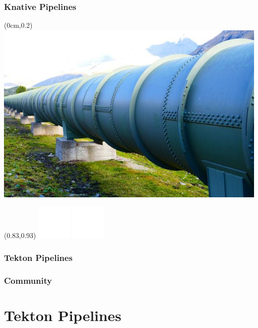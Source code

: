 \documentclass[aspectratio=169,11pt,hyperref={colorlinks=true}]{beamer}
\begin{document}
\begin{lblackrwhiteframe}
\begin{blackframe}
  \frametitle{Knative Pipelines}
  \begin{textblock*}{\paperwidth}(0cm,0.2\paperheight)
    \includegraphics[width=\paperwidth]{img/pipeline_cc0.jpg}
  \end{textblock*}
  \begin{textblock*}{0.2\paperwidth}(0.83\paperwidth,0.93\paperheight)
    \includegraphics[width=0.03\paperwidth]{img/cc.png}
    \includegraphics[width=0.03\paperwidth]{img/zero.png}
  \end{textblock*}
\end{blackframe}

\begin{grayframe}
  \frametitle{Tekton Pipelines}
\end{grayframe}

\begin{grayframe}
  \frametitle{Community}
\end{grayframe}

\section{Tekton Pipelines}


\end{lblackrwhiteframe}
\end{document}
